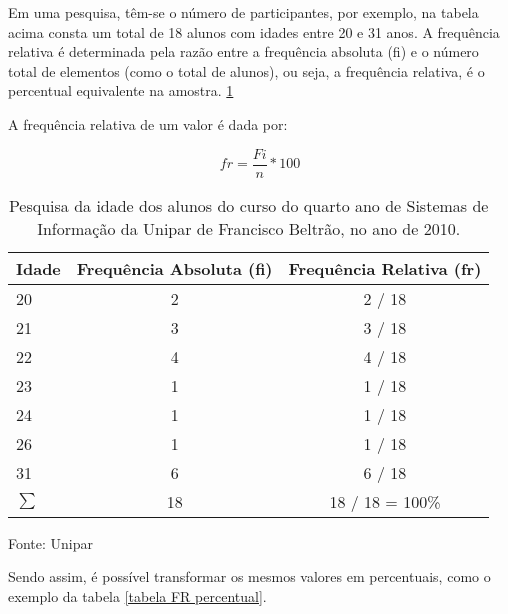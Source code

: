 \documentclass[12pt]{article}
\newcommand{\code}[1] {\textbf{#1}}
\begin{document}
Em uma pesquisa, têm-se o número de participantes, por exemplo, na tabela acima consta um total de 18 alunos com idades entre 20 e 31 anos. A frequência relativa é determinada pela razão entre a frequência absoluta (fi) e o número total de elementos (como o total de alunos), ou seja, a frequência relativa, é o percentual equivalente na amostra. \ref{tabela FR}

A frequência relativa de um valor é dada por:

\begin{equation}
\label{fr}
fr = \frac{Fi}{n} * 100
\end{equation} 

\begin{table}
\caption{Pesquisa da idade dos alunos do curso do quarto ano de Sistemas de Informação da Unipar de Francisco Beltrão, no ano de 2010.}
\label{tabela FR}
\begin{tabular}{|l|c|c|} 
\hline 
Idade & Frequência Absoluta (\code{fi}) & Frequência Relativa (\code{fr}) \\ \hline 
20    &               2                   &              2 / 18 \\ 
21    &               3                   &              3 / 18 \\
22    &               4                   &              4 / 18 \\
23    &               1                   &              1 / 18 \\
24    &               1                   &              1 / 18 \\
26    &               1                   &              1 / 18 \\
31    &               6                   &              6 / 18 \\ 
\hline 
\begin{math}
\sum 
\end{math} & 18 & 18 / 18 = 100\% \\
\hline 
\end{tabular}
\small{Fonte: Unipar}
\end{table}

Sendo assim, é possível transformar os mesmos valores em percentuais, como o exemplo da tabela \ref{tabela FR percentual}.
\end{document}
